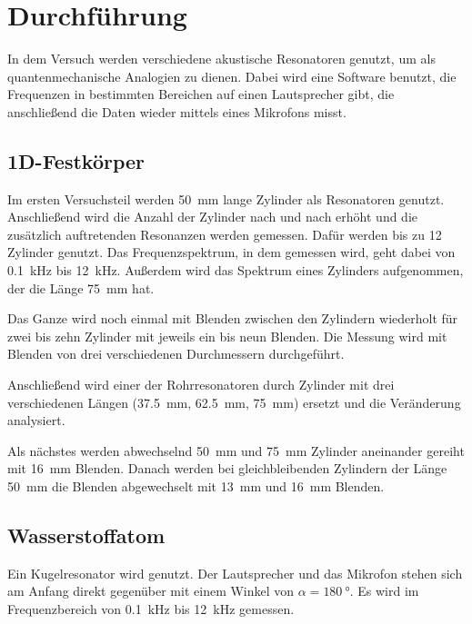 \section{Durchführung}
\label{sec:Durchführung}

In dem Versuch werden verschiedene akustische Resonatoren genutzt, um als quantenmechanische Analogien zu dienen.
Dabei wird eine Software benutzt, die Frequenzen in bestimmten Bereichen auf einen Lautsprecher gibt, die anschließend die Daten wieder mittels eines Mikrofons misst. 

\subsection{1D-Festkörper}

Im ersten Versuchsteil werden \SI{50}{\milli\meter} lange Zylinder als Resonatoren genutzt. Anschließend wird die Anzahl der Zylinder nach und nach erhöht und die zusätzlich auftretenden Resonanzen werden gemessen. 
Dafür werden bis zu \num{12} Zylinder genutzt.
Das Frequenzspektrum, in dem gemessen wird, geht dabei von \SI{0.1}{\kilo\hertz} bis \SI{12}{\kilo\hertz}. 
Außerdem wird das Spektrum eines Zylinders aufgenommen, der die Länge \SI{75}{\milli\metre} hat.

Das Ganze wird noch einmal mit Blenden zwischen den Zylindern wiederholt für zwei bis zehn Zylinder mit jeweils ein bis neun Blenden. Die Messung wird mit Blenden von drei verschiedenen Durchmessern durchgeführt.

Anschließend wird einer der Rohrresonatoren durch Zylinder mit drei verschiedenen Längen (\SI{37.5}{\milli\meter}, \SI{62.5}{\milli\metre}, \SI{75}{\milli\metre}) ersetzt und die Veränderung analysiert. 

Als nächstes werden abwechselnd \SI{50}{\milli\metre} und \SI{75}{\milli\metre} Zylinder aneinander gereiht mit \SI{16}{\milli\meter} Blenden. 
Danach werden bei gleichbleibenden Zylindern der Länge \SI{50}{\milli\metre} die Blenden abgewechselt mit \SI{13}{\milli\metre} und \SI{16}{\milli\meter} Blenden. 

\subsection{Wasserstoffatom}

Ein Kugelresonator wird genutzt. Der Lautsprecher und das Mikrofon stehen sich am Anfang direkt gegenüber mit einem Winkel von $\alpha = \SI{180}{\degree}$. 
Es wird im Frequenzbereich von \SI{0.1}{\kilo\hertz} bis \SI{12}{\kilo\hertz} gemessen. 


